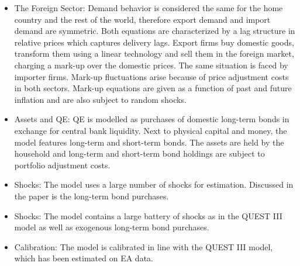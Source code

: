 \documentclass[11pt,a4paper]{article}
\begin{document}
\begin{itemize}
		\item The Foreign Sector:  Demand behavior is considered the same for the home country and the rest of the world, therefore export demand and import demand are symmetric. Both equations are characterized by a lag structure in relative prices which captures delivery lags. Export firms buy domestic goods, transform them using a linear technology and sell them in the foreign market, charging a mark-up over the domestic prices. The same situation is faced by importer firms. Mark-up fluctuations arise because of price adjustment costs in both sectors. Mark-up equations are given as a function of past and future inflation and are also subject to random shocks.
		\item Assets and QE: QE is modelled as purchases of domestic long-term bonds in exchange for central bank liquidity. Next to physical capital and money, the model features long-term and short-term bonds. The assets are held by the household and long-term and short-term bond holdings are subject to portfolio adjustment costs.
		\item Shocks: The model uses a large number of shocks for estimation. Discussed in the paper is the long-term bond purchases.
		\item Shocks: The model contains a large battery of shocks as in the QUEST III model as well as exogenous long-term bond purchases.
		\item Calibration: The model is calibrated in line with the QUEST III model, which has been estimated on EA data. \end{itemize}
	
	
\end{document}
